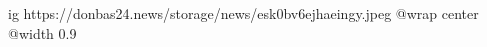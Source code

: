  
 
 
 
 

\ifcmt
  ig https://donbas24.news/storage/news/esk0bv6ejhaeingy.jpeg
  @wrap center
  @width 0.9
\fi
